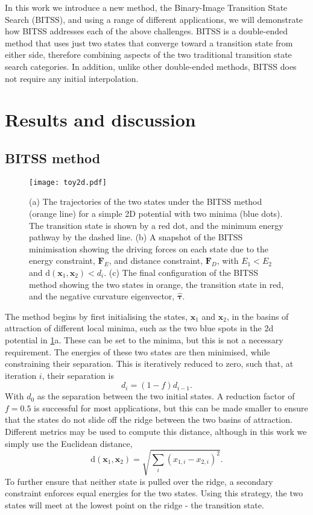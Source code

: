 \documentclass[twocolumn,10pt]{revtex4}
\begin{document}
In this work we introduce a new method, the Binary-Image Transition State Search (BITSS), and using a range of different applications, we will demonstrate how BITSS addresses each of the above challenges.
BITSS is a double-ended method that uses just two states that converge toward a transition state from either side, therefore combining aspects of the two traditional transition state search categories.
In addition, unlike other double-ended methods, BITSS does not require any initial interpolation.


\section{Results and discussion}
\subsection{BITSS method}
\begin{figure}[htb]
  \texttt{[image: toy2d.pdf]}
  \caption{\label{fig:toy2d}
    (a) The trajectories of the two states under the BITSS method (orange line) for a simple 2D potential with two minima (blue dots).
        The transition state is shown by a red dot, and the minimum energy pathway by the dashed line.
    (b) A snapshot of the BITSS minimisation showing the driving forces on each state due to the energy constraint, $\bm{F}_E$, and distance constraint, $\bm{F}_D$, with $E_1 < E_2$ and $\mathrm{d}(\bm{x}_1,\bm{x}_2) < d_i$.
    (c) The final configuration of the BITSS method showing the two states in orange, the transition state in red, and the negative curvature eigenvector, $\bm{\hat{\tau}}$.
  }
\end{figure}

The method begins by first initialising the states, $\bm{x}_1$ and $\bm{x}_2$, in the basins of attraction of different local minima, such as the two blue spots in the 2d potential in \cref{fig:toy2d}a.
These can be set to the minima, but this is not a necessary requirement.
The energies of these two states are then minimised, while constraining their separation.
This is iteratively reduced to zero, such that, at iteration $i$, their separation is
\begin{equation}\label{eq:diteration}
  d_i = (1 - f) d_{i-1}.
\end{equation}
With $d_0$ as the separation between the two initial states.
A reduction factor of $f = 0.5$ is successful for most applications, but this can be made smaller to ensure that the states do not slide off the ridge between the two basins of attraction.
Different metrics may be used to compute this distance, although in this work we simply use the Euclidean distance,
\begin{equation}
  \mathrm{d}(\bm{x}_1, \bm{x}_2) = \sqrt{\sum_i (x_{1,i} - x_{2,i})^2}.
\end{equation}
To further ensure that neither state is pulled over the ridge, a secondary constraint enforces equal energies for the two states.
Using this strategy, the two states will meet at the lowest point on the ridge - the transition state.
\end{document}
